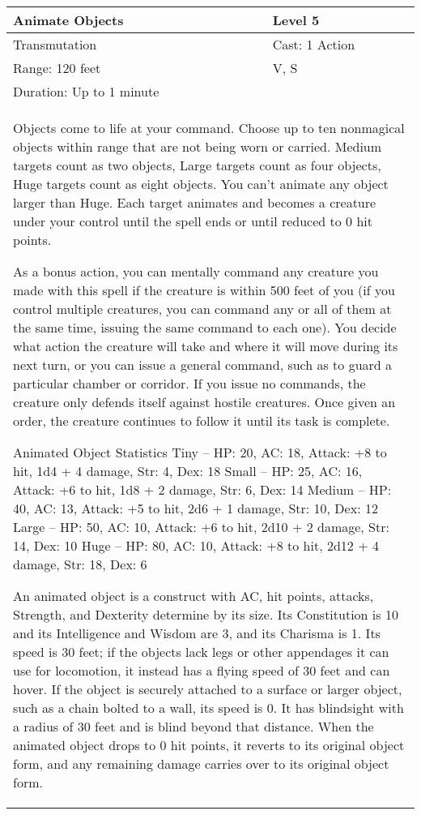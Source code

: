 \documentclass[11pt]{report}
\begin{document}
\begin{table}[H]
	\begin{tabular}{||p{6cm}|p{6cm}||}
		\hline\hline
		\bf{Animate Objects} & Level 5\\ \hline
		Transmutation & Cast: 1 Action\\ \hline
		Range: 120 feet & V, S\\ \hline
		Duration: Up to 1 minute & \\ \hline
		\multicolumn{2}{||p{12cm}||}{Objects come to life at your command. 
Choose up to ten nonmagical objects within range that are not being worn or carried. Medium targets count as two objects, Large targets count as four objects, Huge targets count as eight objects. You can’t animate any object larger than Huge. Each target animates and becomes a creature under your control until the spell ends or until reduced to 0 hit points. 

As a bonus action, you can mentally command any creature you made with this spell if the creature is within 500 feet of you (if you control multiple creatures, you can command any or all of them at the same time, issuing the same command to each one). You decide what action the creature will take and where it will move during its next turn, or you can issue a general command, such as to guard a particular chamber or corridor. If you issue no commands, the creature only defends itself against hostile creatures. Once given an order, the creature continues to follow it until its task is complete. 

Animated Object Statistics 
Tiny – HP: 20, AC: 18, Attack: +8 to hit, 1d4 + 4 damage, Str: 4, Dex: 18 
Small – HP: 25, AC: 16, Attack: +6 to hit, 1d8 + 2 damage, Str: 6, Dex: 14 
Medium – HP: 40, AC: 13, Attack: +5 to hit, 2d6 + 1 damage, Str: 10, Dex: 12 
Large – HP: 50, AC: 10, Attack: +6 to hit, 2d10 + 2 damage, Str: 14, Dex: 10 
Huge – HP: 80, AC: 10, Attack: +8 to hit, 2d12 + 4 damage, Str: 18, Dex: 6 

An animated object is a construct with AC, hit points, attacks, Strength, and Dexterity determine by its size. Its Constitution is 10 and its Intelligence and Wisdom are 3, and its Charisma is 1. Its speed is 30 feet; if the objects lack legs or other appendages it can use for locomotion, it instead has a flying speed of 30 feet and can hover. If the object is securely attached to a surface or larger object, such as a chain bolted to a wall, its speed is 0. It has blindsight with a radius of 30 feet and is blind beyond that distance. When the animated object drops to 0 hit points, it reverts to its original object form, and any remaining damage carries over to its original object form. 

}
\end{tabular}
\end{table}
\end{document}
